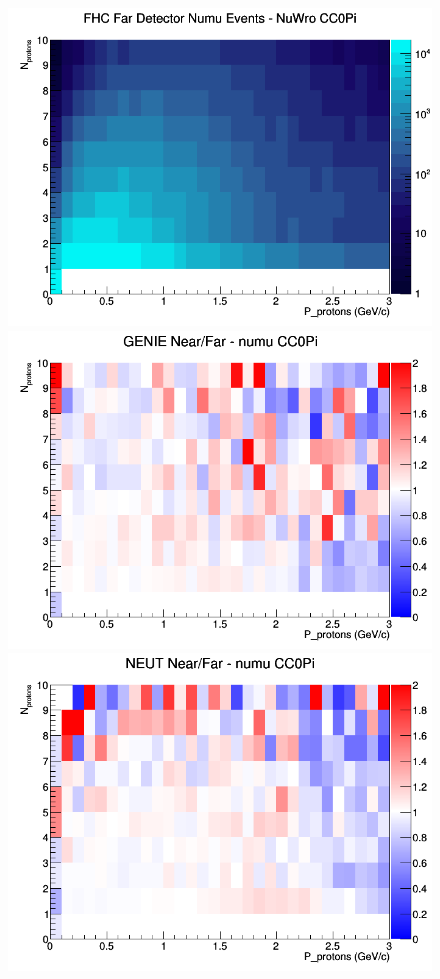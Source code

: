 \begin{figure}[h]
\endminipage
{}
\includegraphics[width=\linewidth]{N_P/nominal/protons/CC0Pi_FHC_FD_numu_N_P_NuWro.png}
\endminipage
\newline
{}
\includegraphics[width=\linewidth]{N_P/nominal/protons/ratios/CC0Pi_GENIE_numu_NF_N_P.png}
\endminipage
{}
\includegraphics[width=\linewidth]{N_P/nominal/protons/ratios/CC0Pi_NEUT_numu_NF_N_P.png}

\end{figure}
